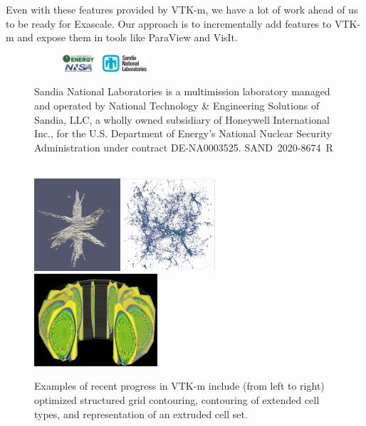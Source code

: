 Even with these features provided by VTK-m, we have a lot of work ahead of us to be ready for Exascale.
Our approach is to incrementally add features to VTK-m and expose them in tools like ParaView and VisIt.


\begin{figure}[t]
  \setlength{\intextsep}{0in}
  \noindent
  \begin{figure}
    \includegraphics[height=0.25in]{projects/2.3.4-DataViz/2.3.4.13-ECP-VTK-m/snl-logos.png}
  \end{figure}
  {\tiny Sandia National Laboratories is a multimission laboratory managed and operated by National Technology \& Engineering Solutions of Sandia, LLC, a wholly owned subsidiary of Honeywell International Inc., for the U.S. Department of Energy's National Nuclear Security Administration under contract DE-NA0003525. \hfill SAND~2020-8674~R
  \par}
  ~\\

  \centering
  \includegraphics[height=1.35in]{projects/2.3.4-DataViz/2.3.4.13-ECP-VTK-m/VTKm-flying-edges}\quad
  \includegraphics[height=1.35in]{projects/2.3.4-DataViz/2.3.4.13-ECP-VTK-m/VTKm-contour-cell-types}\quad
  \includegraphics[height=1.35in]{projects/2.3.4-DataViz/2.3.4.13-ECP-VTK-m/VTKm-extruded-cell-set}\quad
  \caption{
    Examples of recent progress in VTK-m include (from left to right) optimized structured grid contouring, contouring of extended cell types, and representation of an extruded cell set.
  }
  \label{fig:VTKmRecent}
\end{figure}

